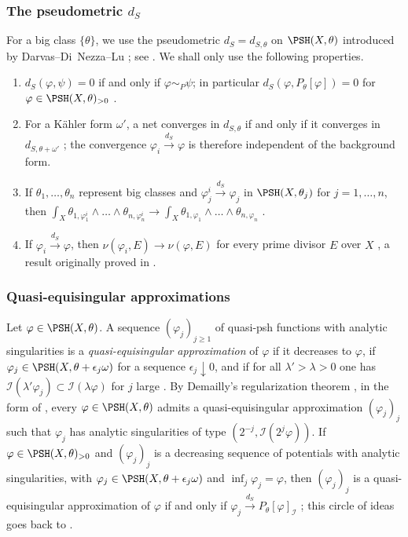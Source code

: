 \subsubsection*{The pseudometric \texorpdfstring{${d_S}$}{dS}}
For a big class $\{\theta\}$, we use the pseudometric
${d_S}=d_{S,\theta}$ on $\PSH(X,\theta)$ introduced by
Darvas--Di~Nezza--Lu \cite{DDNL21}; see
\cite[Definition~6.2.1]{SGPT}. We shall only
use the following properties.
\begin{enumerate}[label=(\alph*),leftmargin=*,itemsep=.2em,topsep=.3em]
\item\label{nk:it:dS-zero} ${d_S}(\varphi,\psi)=0$ if and only if
  $\varphi\sim_P\psi$; in particular ${d_S}(\varphi,P_\theta[\varphi])=0$
  for $\varphi\in\PSH(X,\theta)_{>0}$ \cite[Proposition~6.2.2]{SGPT}.
\item\label{nk:it:dS-background} For a K\"ahler form $\omega'$, a net
  converges in $d_{S,\theta}$ if and only if it converges in
  $d_{S,\theta+\omega'}$ \cite[Corollary~6.2.9]{SGPT}; the convergence
  $\varphi_i\xrightarrow{{d_S}}\varphi$ is therefore independent of the
  background form.
\item\label{nk:it:dS-mass} If $\theta_1,\dots,\theta_n$ represent big
  classes and $\varphi_j^i\xrightarrow{{d_S}}\varphi_j$ in
  $\PSH(X,\theta_j)$ for $j=1,\dots,n$, then
  $\int_X\theta_{1,\varphi^i_1}\wedge\dots\wedge\theta_{n,\varphi^i_n}
  \to\int_X\theta_{1,\varphi_1}\wedge\dots\wedge\theta_{n,\varphi_n}$
  \cite[Theorem~6.2.1]{SGPT}.
\item\label{nk:it:dS-lelong} If $\varphi_i\xrightarrow{{d_S}}\varphi$, then
  $\nu(\varphi_i,E)\to\nu(\varphi,E)$ for every prime divisor $E$ over
  $X$ \cite[Theorem~6.2.4]{SGPT}, a result originally proved in
  \cite{Xia24}.
\end{enumerate}

\subsubsection*{Quasi-equisingular approximations}
Let $\varphi\in\PSH(X,\theta)$. A sequence $(\varphi_j)_{j\ge1}$ of
quasi-psh functions with analytic singularities is a
\emph{quasi-equisingular approximation} of $\varphi$ if it decreases to
$\varphi$, if $\varphi_j\in\PSH(X,\theta+\epsilon_j\omega)$ for a
sequence $\epsilon_j\downarrow0$, and if for all $\lambda'>\lambda>0$
one has $\mathcal I(\lambda'\varphi_j)\subset\mathcal I(\lambda\varphi)$ for $j$ large
\cite[Definition~1.6.4]{SGPT}. By Demailly's regularization theorem
\cite{Dem92,DPS01}, in the form of \cite[Theorem~1.6.2]{SGPT}, every
$\varphi\in\PSH(X,\theta)$ admits a quasi-equisingular approximation
$(\varphi_j)_j$ such that $\varphi_j$ has analytic singularities of
type $(2^{-j},\mathcal I(2^j\varphi))$. If
$\varphi\in\PSH(X,\theta)_{>0}$ and $(\varphi_j)_j$ is a decreasing
sequence of potentials with analytic singularities, with
$\varphi_j\in\PSH(X,\theta+\epsilon_j\omega)$ and $\inf_j\varphi_j=\varphi$,
then $(\varphi_j)_j$ is a quasi-equisingular approximation of
$\varphi$ if and only if $\varphi_j\xrightarrow{{d_S}}P_\theta[\varphi]_\mathcal I$
\cite[Corollary~7.1.2]{SGPT}; this circle of ideas goes back to
\cite{DX22,DX24b}.

